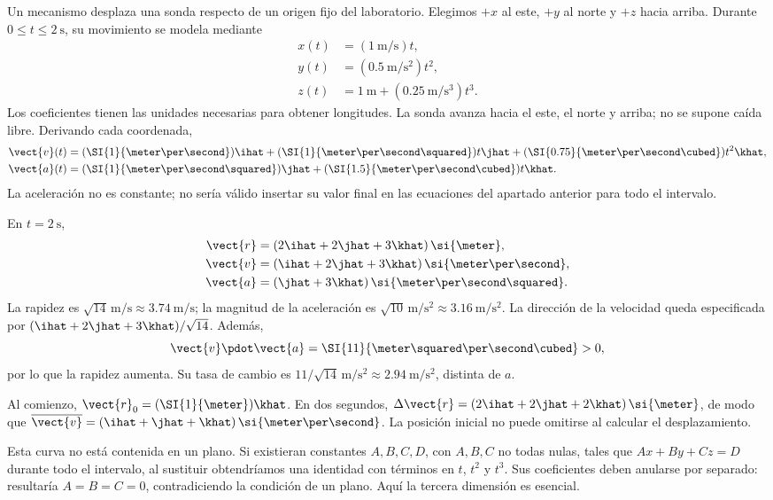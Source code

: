 \begin{ejemplo}
Un mecanismo desplaza una sonda respecto de un origen fijo del laboratorio.
Elegimos \(+x\) al este, \(+y\) al norte y \(+z\) hacia arriba.
Durante \(0\leq t\leq\SI{2}{\second}\), su movimiento se modela mediante
\[
\begin{aligned}
x(t)&=(\SI{1}{\meter\per\second})t,\\
y(t)&=(\SI{0.5}{\meter\per\second\squared})t^2,\\
z(t)&=\SI{1}{\meter}+(\SI{0.25}{\meter\per\second\cubed})t^3.
\end{aligned}
\]
Los coeficientes tienen las unidades necesarias para obtener longitudes.
La sonda avanza hacia el este, el norte y arriba; no se supone caída libre.
Derivando cada coordenada,
\[
\begin{aligned}
\vect{v}(t)&=(\SI{1}{\meter\per\second})\ihat
+(\SI{1}{\meter\per\second\squared})t\jhat
+(\SI{0.75}{\meter\per\second\cubed})t^2\khat,\\
\vect{a}(t)&=(\SI{1}{\meter\per\second\squared})\jhat
+(\SI{1.5}{\meter\per\second\cubed})t\khat.
\end{aligned}
\]
La aceleración no es constante; no sería válido insertar su valor final
en las ecuaciones del apartado anterior para todo el intervalo.

En \(t=\SI{2}{\second}\),
\[
\begin{aligned}
\vect{r}&=(2\ihat+2\jhat+3\khat)\,\si{\meter},\\
\vect{v}&=(\ihat+2\jhat+3\khat)\,\si{\meter\per\second},\\
\vect{a}&=(\jhat+3\khat)\,\si{\meter\per\second\squared}.
\end{aligned}
\]
La rapidez es \(\sqrt{14}\,\si{\meter\per\second}\approx
\SI{3.74}{\meter\per\second}\); la magnitud de la aceleración es
\(\sqrt{10}\,\si{\meter\per\second\squared}\approx
\SI{3.16}{\meter\per\second\squared}\). La dirección de la velocidad
queda especificada por \((\ihat+2\jhat+3\khat)/\sqrt{14}\).
Además,
\[ \vect{v}\pdot\vect{a}=\SI{11}{\meter\squared\per\second\cubed}>0, \]
por lo que la rapidez aumenta. Su tasa de cambio es
\(11/\sqrt{14}\,\si{\meter\per\second\squared}\approx
\SI{2.94}{\meter\per\second\squared}\), distinta de \(a\).

Al comienzo, \(\vect{r}_0=(\SI{1}{\meter})\khat\). En dos segundos,
\(\Delta\vect{r}=(2\ihat+2\jhat+2\khat)\,\si{\meter}\), de modo que
\(\overline{\vect{v}}=(\ihat+\jhat+\khat)\,\si{\meter\per\second}\).
La posición inicial no puede omitirse al calcular el desplazamiento.

Esta curva no está contenida en un plano. Si existieran constantes
\(A,B,C,D\), con \(A,B,C\) no todas nulas, tales que \(Ax+By+Cz=D\)
durante todo el intervalo, al sustituir obtendríamos una identidad con
términos en \(t\), \(t^2\) y \(t^3\). Sus coeficientes deben anularse
por separado: resultaría \(A=B=C=0\), contradiciendo la condición de
un plano. Aquí la tercera dimensión es esencial.
\end{ejemplo}

